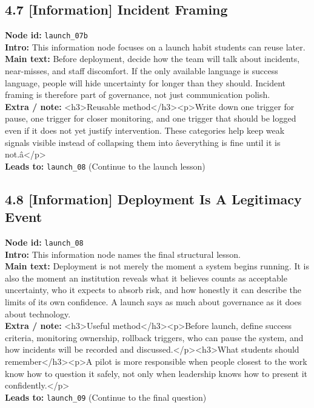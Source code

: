 \documentclass[11pt]{article}
\begin{document}
\subsection*{4.7 [Information] Incident Framing}
\textbf{Node id:} \texttt{launch\_07b}\\
\textbf{Intro:} This information node focuses on a launch habit students can reuse later.\\
\textbf{Main text:} Before deployment, decide how the team will talk about incidents, near-misses, and staff discomfort. If the only available language is success language, people will hide uncertainty for longer than they should. Incident framing is therefore part of governance, not just communication polish.\\
\textbf{Extra / note:} <h3>Reusable method</h3><p>Write down one trigger for pause, one trigger for closer monitoring, and one trigger that should be logged even if it does not yet justify intervention. These categories help keep weak signals visible instead of collapsing them into âeverything is fine until it is not.â</p>\\
\textbf{Leads to:} \texttt{launch\_08} (Continue to the launch lesson)\\
\subsection*{4.8 [Information] Deployment Is A Legitimacy Event}
\textbf{Node id:} \texttt{launch\_08}\\
\textbf{Intro:} This information node names the final structural lesson.\\
\textbf{Main text:} Deployment is not merely the moment a system begins running. It is also the moment an institution reveals what it believes counts as acceptable uncertainty, who it expects to absorb risk, and how honestly it can describe the limits of its own confidence. A launch says as much about governance as it does about technology.\\
\textbf{Extra / note:} <h3>Useful method</h3><p>Before launch, define success criteria, monitoring ownership, rollback triggers, who can pause the system, and how incidents will be recorded and discussed.</p><h3>What students should remember</h3><p>A pilot is more responsible when people closest to the work know how to question it safely, not only when leadership knows how to present it confidently.</p>\\
\textbf{Leads to:} \texttt{launch\_09} (Continue to the final question)\\
\end{document}
